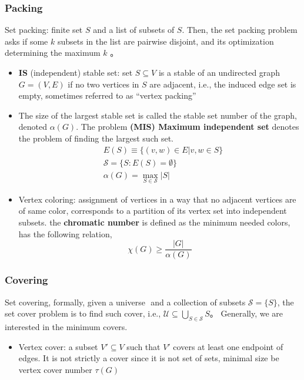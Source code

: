 \subsubsection*{Packing}
Set packing: finite set \(S\) and a list of subsets of \(S\). Then, the set packing problem asks if some \(k\) subsets in the list are pairwise disjoint, and its optimization determining the maximum \(k\) 。
\begin{itemize}
      \item \textbf{IS} (independent) stable set: set \(S \subseteq V\) is a stable of an
            undirected graph \(G = (V, E)\) if no two vertices in \(S\) are
            adjacent, i.e., the induced edge set is empty, sometimes referred to as ``vertex packing''
      \item The size of the
            largest stable set is called the stable set number of the graph,
            denoted \(\alpha(G)\). The problem \textbf{(MIS) Maximum independent set} denotes the problem of finding the largest such set.
            \begin{equation}
                  \begin{aligned}
                         & E(S) \equiv \{(v, w) \in E | v, w \in S\} \\
                         & \mathscr S = \{S: E(S)= \emptyset\}       \\
                         & \alpha (G) = \max_{S\in \mathscr S} |S|
                  \end{aligned}
            \end{equation}

      \item Vertex coloring: assignment of vertices in a way that no adjacent vertices are of same color, corresponds to a partition of its vertex set into independent subsets. the \textbf{chromatic number} is defined as the minimum needed colors, has the following relation,
            \begin{equation}
                  \chi(G) \ge \frac{|G|}{\alpha(G)}
            \end{equation}
\end{itemize}

\subsubsection*{Covering}
Set covering, formally, given a universe \(\) and a collection of subsets \(\mathscr S = \{S\}\), the set cover problem is to find such cover, i.e., \(\mathscr U \subseteq \bigcup_{S\in\mathscr S} S \)。 Generally, we are interested in the minimum covers.
\begin{itemize}
      \item Vertex cover: a subset \(V' \subseteq V\) such that \(V'\) covers at least one endpoint of edges. It is not strictly a cover since it is not set of sets, minimal size be vertex cover number \(\tau(G)\)
\end{itemize}


